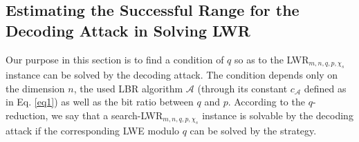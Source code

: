 \documentclass{cta-author}
\begin{document}
\subsection{Estimating the Successful Range for  the Decoding  Attack in Solving LWR}

Our purpose in this section is to find a condition of $q$ so as to the LWR$_{m,n,q,p,\chi_s}$ instance can be solved by the  decoding  attack. The condition depends only on the dimension $n$, the used LBR algorithm $\mathcal{A}$ (through its constant $c_{\mathcal{A}}$ defined as in Eq. \eqref{eq1}) as well as the bit ratio between $q$ and $p$. According to the $q$-reduction, we say that a search-LWR$_{m,n,q,p,\chi_s}$ instance is solvable by the  decoding  attack if the corresponding LWE modulo $q$ can be solved by the strategy.
\end{document}
